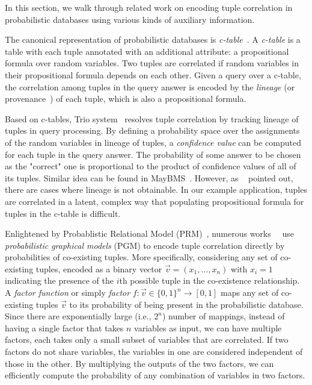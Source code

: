 \label{sec:relatedwork}
In this section, we walk through related work on encoding tuple correlation in probabilistic databases using various kinds of auxiliary information.

The canonical representation of probabilistic databases is \emph{c-table}~\cite{suciu2009probabilistic}.
A \emph{c-table} is a table with each tuple annotated with an additional attribute: a propositional formula over random variables. 
Two tuples are correlated if random variables in their propositional formula depends on each other.
Given a query over a c-table, the correlation among tuples in the query answer is encoded by the \emph{lineage} (or provenance~\cite{cui2003lineage}) of each tuple, which is also a propositional formula.

Based on c-tables, Trio system~\cite{benjelloun2006uldbs} resolves tuple correlation by tracking lineage of tuples in query processing.
By defining a probability space over the assignments of the random variables in lineage of tuples, a \emph{confidence value} can be computed for each tuple in the query answer.
The probability of some answer to be chosen as the "correct" one is proportional to the product of confidence values of all of its tuples.
Similar idea can be found in MayBMS~\cite{Huang:2009:MPD:1559845.1559984}.
However, as ~\cite{re2007materialized} pointed out, there are cases where lineage is not obtainable.
In our example application, tuples are correlated in a latent, complex way that populating propositional formula for tuples in the c-table is difficult.  

Enlightened by Probablistic Relational Model (PRM)~\cite{friedman1999learning}, numerous works~~\cite{sen2007representing, sen2009prdb} use \emph{probabilistic graphical models} (PGM) to encode tuple correlation directly by probabilities of co-existing tuples.
More specifically, considering any set of co-existing tuples, encoded as a binary vector $\vec v=(x_1,\ldots,x_n)$ with $x_i=1$ indicating the presence of the $i$th possible tuple in the co-existence relationship.
A \emph{factor function} or simply \emph{factor} $f: \vec v\in\{0,1\}^n \to [0,1]$ maps any set of co-existing tuples $\vec v$ to its probability of being present in the probabilistic database. 
Since there are exponentially large (i.e., $2^n$) number of mappings, instead of having a single factor that takes $n$ variables as input, we can have multiple factors, each takes only a small subset of variables that are correlated.
If two factors do not share variables, the variables in one are considered independent of those in the other.
By multiplying the outputs of the two factors, we can efficiently compute the probability of any combination of variables in two factors. 

